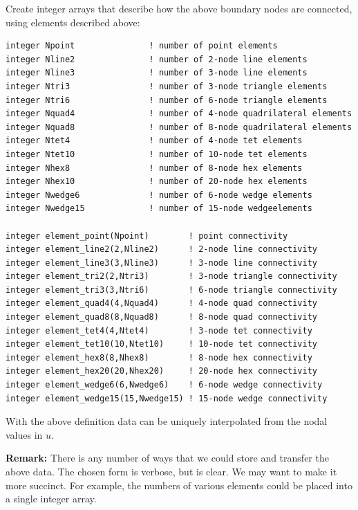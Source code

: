 \documentclass[11pt]{article}
\begin{document}
Create integer arrays that describe how the above boundary nodes are
connected, using elements described above:
\begin{verbatim}
integer Npoint               ! number of point elements
integer Nline2               ! number of 2-node line elements
integer Nline3               ! number of 3-node line elements
integer Ntri3                ! number of 3-node triangle elements
integer Ntri6                ! number of 6-node triangle elements
integer Nquad4               ! number of 4-node quadrilateral elements
integer Nquad8               ! number of 8-node quadrilateral elements
integer Ntet4                ! number of 4-node tet elements
integer Ntet10               ! number of 10-node tet elements
integer Nhex8                ! number of 8-node hex elements
integer Nhex10               ! number of 20-node hex elements
integer Nwedge6              ! number of 6-node wedge elements
integer Nwedge15             ! number of 15-node wedgeelements

integer element_point(Npoint)        ! point connectivity
integer element_line2(2,Nline2)      ! 2-node line connectivity
integer element_line3(3,Nline3)      ! 3-node line connectivity
integer element_tri2(2,Ntri3)        ! 3-node triangle connectivity
integer element_tri3(3,Ntri6)        ! 6-node triangle connectivity
integer element_quad4(4,Nquad4)      ! 4-node quad connectivity
integer element_quad8(8,Nquad8)      ! 8-node quad connectivity
integer element_tet4(4,Ntet4)        ! 3-node tet connectivity
integer element_tet10(10,Ntet10)     ! 10-node tet connectivity
integer element_hex8(8,Nhex8)        ! 8-node hex connectivity
integer element_hex20(20,Nhex20)     ! 20-node hex connectivity
integer element_wedge6(6,Nwedge6)    ! 6-node wedge connectivity
integer element_wedge15(15,Nwedge15) ! 15-node wedge connectivity

\end{verbatim}

With the above definition data can be uniquely interpolated from the nodal
values in $u$.

\textbf{Remark:} There is any number of ways that we could store and
transfer the above data.  The chosen form is verbose, but is clear.  We may
want to make it more succinct.  For example, the numbers of various elements
could be placed into a single integer array.  
\end{document}
